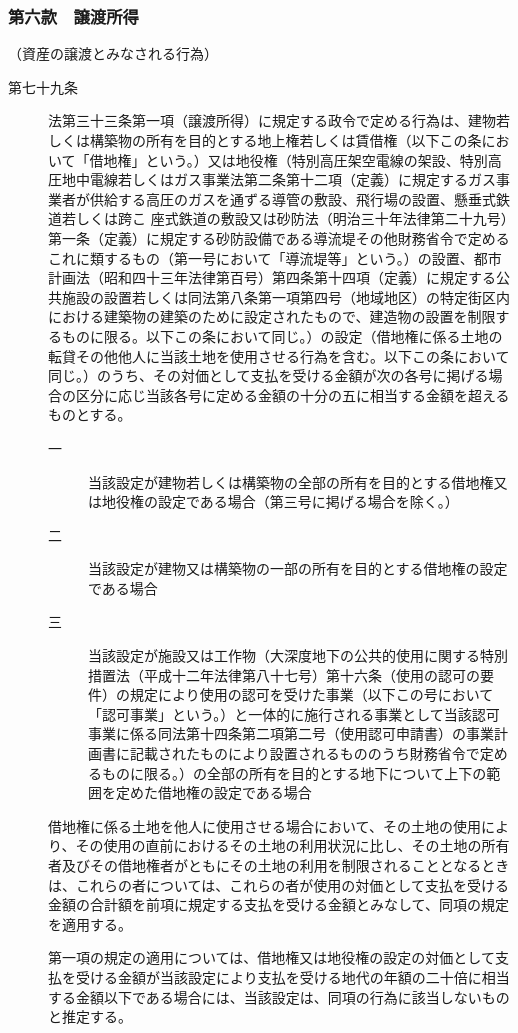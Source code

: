 \documentclass[twocolumn,a4j,10pt]{ltjtarticle}
\begin{document}
\subsubsection*{第六款　譲渡所得}
\noindent\hspace{10pt}（資産の譲渡とみなされる行為）
\begin{description}
\item[第七十九条]法第三十三条第一項（譲渡所得）に規定する政令で定める行為は、建物若しくは構築物の所有を目的とする地上権若しくは賃借権（以下この条において「借地権」という。）又は地役権（特別高圧架空電線の架設、特別高圧地中電線若しくはガス事業法第二条第十二項（定義）に規定するガス事業者が供給する高圧のガスを通ずる導管の敷設、飛行場の設置、懸垂式鉄道若しくは跨こ
座式鉄道の敷設又は砂防法（明治三十年法律第二十九号）第一条（定義）に規定する砂防設備である導流堤その他財務省令で定めるこれに類するもの（第一号において「導流堤等」という。）の設置、都市計画法（昭和四十三年法律第百号）第四条第十四項（定義）に規定する公共施設の設置若しくは同法第八条第一項第四号（地域地区）の特定街区内における建築物の建築のために設定されたもので、建造物の設置を制限するものに限る。以下この条において同じ。）の設定（借地権に係る土地の転貸その他他人に当該土地を使用させる行為を含む。以下この条において同じ。）のうち、その対価として支払を受ける金額が次の各号に掲げる場合の区分に応じ当該各号に定める金額の十分の五に相当する金額を超えるものとする。
\begin{description}
\item[一]当該設定が建物若しくは構築物の全部の所有を目的とする借地権又は地役権の設定である場合（第三号に掲げる場合を除く。）
\item[二]当該設定が建物又は構築物の一部の所有を目的とする借地権の設定である場合
\item[三]当該設定が施設又は工作物（大深度地下の公共的使用に関する特別措置法（平成十二年法律第八十七号）第十六条（使用の認可の要件）の規定により使用の認可を受けた事業（以下この号において「認可事業」という。）と一体的に施行される事業として当該認可事業に係る同法第十四条第二項第二号（使用認可申請書）の事業計画書に記載されたものにより設置されるもののうち財務省令で定めるものに限る。）の全部の所有を目的とする地下について上下の範囲を定めた借地権の設定である場合
\end{description}
\item[]借地権に係る土地を他人に使用させる場合において、その土地の使用により、その使用の直前におけるその土地の利用状況に比し、その土地の所有者及びその借地権者がともにその土地の利用を制限されることとなるときは、これらの者については、これらの者が使用の対価として支払を受ける金額の合計額を前項に規定する支払を受ける金額とみなして、同項の規定を適用する。
\item[]第一項の規定の適用については、借地権又は地役権の設定の対価として支払を受ける金額が当該設定により支払を受ける地代の年額の二十倍に相当する金額以下である場合には、当該設定は、同項の行為に該当しないものと推定する。
\end{description}
\end{document}
